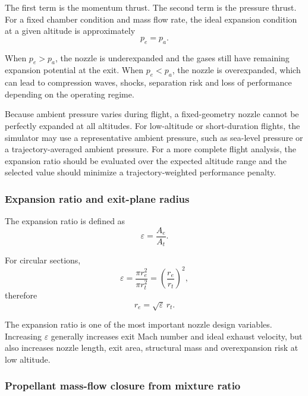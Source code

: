 \documentclass[11pt,a4paper]{article}
\begin{document}
The first term is the momentum thrust. The second term is the pressure thrust. For a fixed chamber condition and mass flow rate, the ideal expansion condition at a given altitude is approximately
\begin{equation}
p_e=p_a .
\label{eq:ideal_expansion}
\end{equation}

When $p_e>p_a$, the nozzle is underexpanded and the gases still have remaining expansion potential at the exit. When $p_e<p_a$, the nozzle is overexpanded, which can lead to compression waves, shocks, separation risk and loss of performance depending on the operating regime.

Because ambient pressure varies during flight, a fixed-geometry nozzle cannot be perfectly expanded at all altitudes. For low-altitude or short-duration flights, the simulator may use a representative ambient pressure, such as sea-level pressure or a trajectory-averaged ambient pressure. For a more complete flight analysis, the expansion ratio should be evaluated over the expected altitude range and the selected value should minimize a trajectory-weighted performance penalty.

\subsubsection{Expansion ratio and exit-plane radius}

The expansion ratio is defined as
\begin{equation}
\varepsilon=\frac{A_e}{A_t} .
\label{eq:expansion_ratio}
\end{equation}

For circular sections,
\begin{equation}
\varepsilon=\frac{\pi r_e^2}{\pi r_t^2}=\left(\frac{r_e}{r_t}\right)^2,
\end{equation}
therefore
\begin{equation}
r_e=\sqrt{\varepsilon}\,r_t .
\label{eq:exit_radius}
\end{equation}

The expansion ratio is one of the most important nozzle design variables. Increasing $\varepsilon$ generally increases exit Mach number and ideal exhaust velocity, but also increases nozzle length, exit area, structural mass and overexpansion risk at low altitude.

\subsubsection{Propellant mass-flow closure from mixture ratio}
\end{document}
